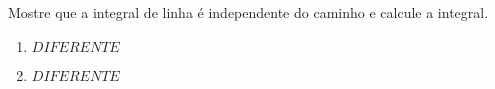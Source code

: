 	\vspace{5mm}
	
	Mostre que a integral de linha é independente do caminho e calcule a integral.
	
	\begin{enumerate}[resume]

		\item $DIFERENTE$

		\item $DIFERENTE$
	
	\end{enumerate}
		
	\vspace{5mm}	
	
	



